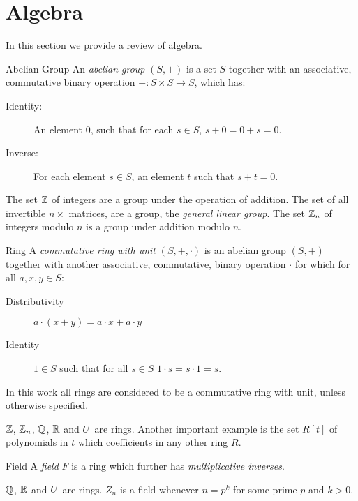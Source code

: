 \section{Algebra}
In this section we provide a review of algebra. 
\begin{definition}{Abelian Group}
An \emph{abelian group} $(S,+)$ is a set $S$ together with an associative, commutative binary operation $+: S \times S \rightarrow S$, which has:
\begin{description}
\item[Identity:] An element $0$, such that for each $s \in S$, $s+0 = 0+s = 0$.
\item[Inverse:] For each element $s \in S$, an element $t$ such that $s+t = 0$.
\end{description}
\end{definition}
\begin{example}
The set $\mathbb{Z}$ of integers are a group under the operation of addition. The set of all invertible $n \times $ matrices, are a group, the \emph{general linear group}.
The set $\mathbb{Z}_n$ of integers modulo $n$ is a group under addition modulo $n$.
\end{example}
\begin{definition}{Ring}
A \emph{commutative ring with unit} $(S,+,\cdot)$ is an abelian group $(S,+)$  together with another associative, commutative, binary operation $\cdot$ for which for all $a,x,y \in S$:
\begin{description}
\item[Distributivity] $a \cdot (x + y)  = a \cdot x + a \cdot y$ 
\item[Identity] $1 \in S$ such that for all $s \in S$ $1 \cdot s = s \cdot 1 = s$. 
\end{description}
\end{definition}
In this work all rings are considered to be a commutative ring with unit, unless otherwise specified.  
\begin{example}
$\mathbb{Z}$, $\mathbb{Z}_n$, $\mathbb{Q}$, $\mathbb{R}$ and $U$ are rings. Another important example is the set $R[t]$ of polynomials in $t$ which coefficients in any other ring $R$.
\end{example}
\begin{definition}{Field}
A \emph{field} $F$ is a ring which further has \emph{multiplicative inverses}.
\end{definition}
\begin{example}
$\mathbb{Q}$, $\mathbb{R}$ and $U$ are rings.  $Z_n$ is a field whenever $n = p^k$ for some prime $p$ and $k > 0$.
\end{example}
